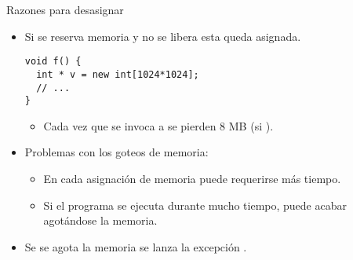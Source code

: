 \begin{frame}[fragile]{Razones para desasignar}
\begin{itemize}
  \item Si se reserva memoria y no se libera esta queda asignada.
\begin{lstlisting}
void f() {
  int * v = new int[1024*1024];
  // ...
}
\end{lstlisting}
    \begin{itemize}
      \item Cada vez que se invoca a  se pierden 8 MB (si ).
    \end{itemize}
  \item Problemas con los goteos de memoria:
    \begin{itemize}
      \item En cada asignación de memoria puede requerirse más tiempo.
      \item Si el programa se ejecuta durante mucho tiempo, puede acabar agotándose la memoria.
    \end{itemize}
  \item Se se agota la memoria se lanza la excepción .
\end{itemize}
\end{frame}

